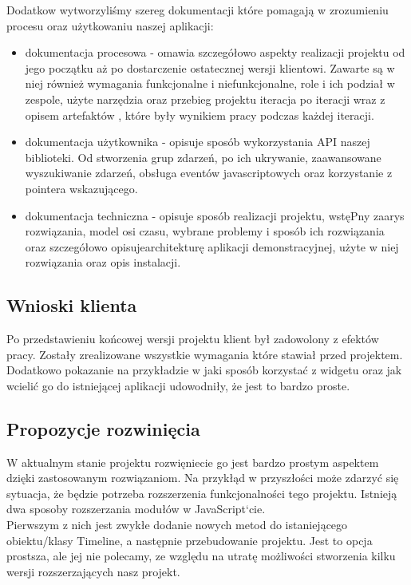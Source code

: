 \documentclass[polish,12pt]{aghthesis}
\begin{document}
Dodatkow wytworzyliśmy szereg dokumentacji które pomagają w zrozumieniu procesu oraz użytkowaniu naszej aplikacji:
\begin{itemize}
	\item dokumentacja procesowa - omawia szczegółowo aspekty realizacji projektu od jego początku aż po dostarczenie ostatecznej wersji klientowi. Zawarte są w niej również wymagania funkcjonalne i niefunkcjonalne, role i ich podział w zespole, użyte narzędzia oraz przebieg projektu iteracja po iteracji wraz z opisem artefaktów , które były wynikiem pracy podczas każdej iteracji.
	\item dokumentacja użytkownika - opisuje sposób wykorzystania API naszej biblioteki. Od stworzenia grup zdarzeń, po ich ukrywanie, zaawansowane wyszukiwanie zdarzeń, obsługa eventów javascriptowych oraz korzystanie z pointera wskazującego.
	\item dokumentacja techniczna - opisuje sposób realizacji projektu, wstęPny zaarys rozwiązania, model osi czasu, wybrane problemy i sposób ich rozwiązania oraz szczegółowo opisujearchitekturę aplikacji demonstracyjnej, użyte w niej rozwiązania oraz opis instalacji.
\end{itemize}

\subsection{Wnioski klienta}

Po przedstawieniu końcowej wersji projektu klient był zadowolony z efektów pracy.
Zostały zrealizowane wszystkie wymagania które stawiał przed projektem.
Dodatkowo pokazanie na przykładzie w jaki sposób korzystać z widgetu oraz jak wcielić go do istniejącej aplikacji udowodniły, że jest to bardzo proste.

\subsection{Propozycje rozwinięcia}

W aktualnym stanie projektu rozwięniecie go jest bardzo prostym aspektem dzięki zastosowanym rozwiązaniom. Na przykłąd w przyszłości może zdarzyć się sytuacja, że będzie potrzeba rozszerzenia funkcjonalności tego projektu. Istnieją dwa sposoby rozszerzania modułów w JavaScript`cie. \\

Pierwszym z nich jest zwykłe dodanie nowych metod do istaniejącego obiektu/klasy Timeline, a następnie przebudowanie projektu. Jest to opcja prostsza, ale jej nie polecamy, ze względu na utratę możliwości stworzenia kilku wersji rozszerzających nasz projekt.\\
\end{document}
